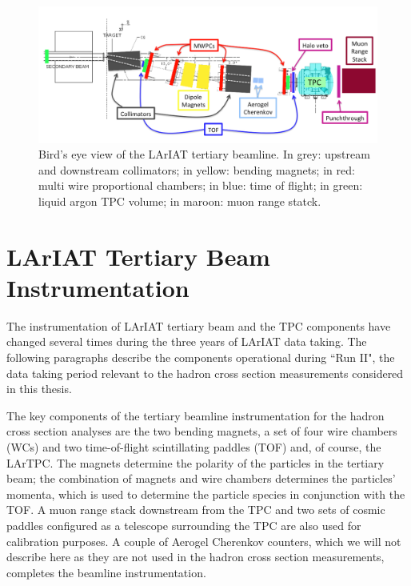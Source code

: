 \begin{figure}
  \centering  	
\includegraphics[width=\textwidth,height=\textheight,keepaspectratio]{Chapter-3/Images/Tertiary.png}
\caption{Bird's eye view of the LArIAT tertiary beamline. In grey: upstream and downstream collimators; in yellow: bending magnets; in red: multi wire proportional chambers; in blue: time of flight; in green: liquid argon TPC volume; in maroon: muon range statck.}
\label{fig:tert-layout}
\end{figure}


\section{LArIAT Tertiary Beam Instrumentation}\label{sec:Instrumentation}

The instrumentation of  LArIAT tertiary beam and the TPC components have changed several times during the three years of LArIAT data taking. The following paragraphs describe the components operational during ``Run II", the data taking period relevant to the hadron cross section measurements considered in this thesis. 

The key components of the tertiary beamline instrumentation for the hadron cross section analyses are the two bending magnets, a set of four wire chambers (WCs) and two time-of-flight scintillating paddles (TOF) and, of course, the LArTPC.  The magnets determine the polarity of the particles in the tertiary beam; the combination of magnets and wire chambers determines the particles' momenta, which is used to determine the particle species in conjunction with the TOF.
A muon range stack downstream from the TPC and two sets of cosmic paddles configured as a telescope surrounding the TPC are also used for calibration purposes.
A couple of Aerogel Cherenkov counters, which we will not describe here as they are not used in the hadron cross section measurements,  completes the beamline instrumentation.



